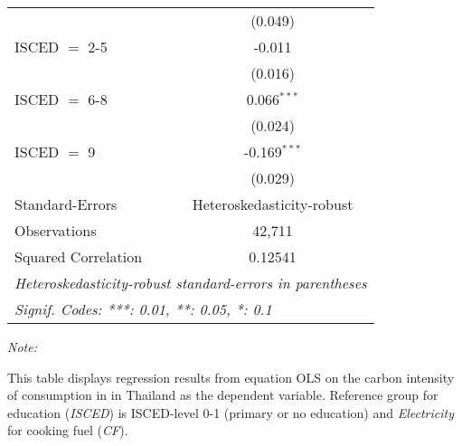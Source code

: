 \begin{table}[htbp!]
\begin{adjustbox}{width = 1\textwidth, max height = 0.95\textheight, center}
\begin{threeparttable}[b]
\begin{tabular}{lc}
                                & (0.049)\\   
            ISCED $=$ 2-5       & -0.011\\   
                                & (0.016)\\   
            ISCED $=$ 6-8       & 0.066$^{***}$\\   
                                & (0.024)\\   
            ISCED $=$ 9         & -0.169$^{***}$\\   
                                & (0.029)\\   
            \midrule 
            Standard-Errors     & Heteroskedasticity-robust \\   
            Observations        & 42,711\\  
            Squared Correlation & 0.12541\\  
            \midrule \midrule
            \multicolumn{2}{l}{\emph{Heteroskedasticity-robust standard-errors in parentheses}}\\
            \multicolumn{2}{l}{\emph{Signif. Codes: ***: 0.01, **: 0.05, *: 0.1}}\\
         \end{tabular}
         
         \begin{tablenotes}\item \medskip \textit{Note:}
            \item This table displays regression results from equation OLS on the carbon intensity of consumption in  in Thailand as the dependent variable. Reference group for education (\textit{ISCED}) is ISCED-level 0-1 (primary or no education) and \textit{Electricity} for cooking fuel (\textit{CF}).
         \end{tablenotes}
      \end{threeparttable}
   \end{adjustbox}
\end{table}


